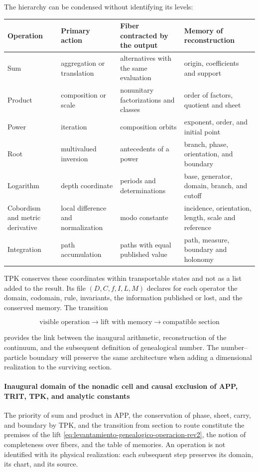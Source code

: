 The hierarchy can be condensed without identifying its levels:

\begin{center}
\small
\begin{tabularx}{\textwidth}{@{}
  >{\raggedright\arraybackslash}p{}
  >{\raggedright\arraybackslash}p{}
  >{\raggedright\arraybackslash}X
  >{\raggedright\arraybackslash}p{}@{}}
\toprule
\textbf{Operation} & \textbf{Primary action} &
\textbf{Fiber contracted by the output} & \textbf{Memory of reconstruction}\\
\midrule
Sum & aggregation or translation & alternatives with the same evaluation &
origin, coefficients and support\\
Product & composition or scale & nonunitary factorizations and classes &
order of factors, quotient and sheet\\
Power & iteration & composition orbits &
exponent, order, and initial point\\
Root & multivalued inversion & antecedents of a power &
branch, phase, orientation, and boundary\\
Logarithm & depth coordinate & periods and determinations &
base, generator, domain, branch, and cutoff\\
Cobordism and metric derivative & local difference and normalization & modo constante &
incidence, orientation, length, scale and reference\\
Integration & path accumulation & paths with equal published value &
path, measure, boundary and holonomy\\
\bottomrule
\end{tabularx}
\end{center}

TPK conserves these coordinates within transportable states and not as a
list added to the result. Its file \((D,C,f,I,L,M)\) declares for each
operator the domain, codomain, rule, invariants, the information
published or lost, and the conserved memory. The transition

\[
 \text{visible operation}
 \longrightarrow
 \text{lift with memory}
 \longrightarrow
 \text{compatible section}
\]

provides the link between the inaugural arithmetic, reconstruction of the
continuum, and the subsequent definition of genealogical number. The
number--particle boundary will preserve the same architecture when adding a
dimensional realization to the surviving section.

\paragraph{Inaugural domain of the nonadic cell and causal exclusion of APP, TRIT, TPK, and analytic constants}
The priority of sum and product in APP, the conservation of phase, sheet,
carry, and boundary by TPK, and the transition from section to route constitute the
premises of the lift
\eqref{eq:levantamiento-genealogico-operacion-rev2}, the notion of completeness
over fibers, and the table of memories. An operation is not identified with its physical realization:
each subsequent step preserves its domain, its chart, and its source.
